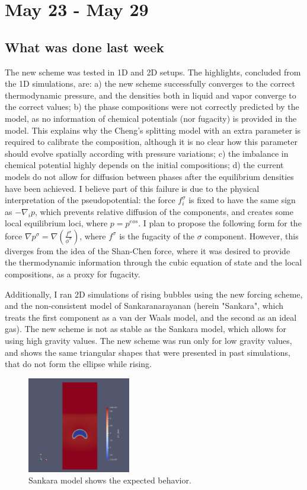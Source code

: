 \documentclass[12pt]{article}
\begin{document}
	\section*{May 23 - May 29}
	\subsection*{What was done last week}
	The new scheme was tested in 1D and 2D setups. The highlights, concluded from the 1D simulations, are: a) the new scheme successfully converges to the correct thermodynamic pressure, and the densities both in liquid and vapor converge to the correct values; b) the phase compositions were not correctly predicted by the model, as no information of chemical potentials (nor fugacity) is provided in the model. This explains why the Cheng's splitting model with an extra parameter is required to calibrate the composition, although it is no clear how this parameter should evolve spatially according with pressure variations; c) the imbalance in chemical potential highly depends on the initial compositions; d) the current models do not allow for diffusion between phases after the equilibrium densities have been achieved. I believe part of this failure is due to the physical interpretation of the pseudopotential: the force $f^\sigma_{i}$ is fixed to have the same sign as $-\nabla_i p$, which prevents relative diffusion of the components, and creates some local equilibrium loci, where $p = p^{eos}$. I plan to propose the following form for the force $\nabla p^\sigma = \nabla (\frac{f^\sigma}{\phi^\sigma})$, where $f^\sigma$ is the fugacity of the $\sigma$ component. However, this diverges from the idea of the Shan-Chen force, where it was desired to provide the thermodynamic information through the cubic equation of state and the local compositions, as a proxy for fugacity. 
	
	Additionally, I ran 2D simulations of rising bubbles using the new forcing scheme, and the non-consistent model of  Sankaranarayanan (herein "Sankara", which treats the first component as a van der Waals model, and the second as an ideal gas). The new scheme is not as stable as the Sankara model, which allows for using high gravity values. The new scheme was run only for low gravity values, and shows the same triangular shapes that were presented in past simulations, that do not form the ellipse while rising.  
	
	\begin{figure}
		\caption{Sankara model shows the expected behavior.}
		\includegraphics[width=0.4\textwidth]{pics/risingSankara.png}
	\end{figure}
	
\end{document}
